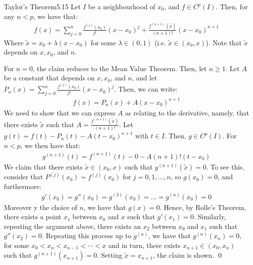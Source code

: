 \begin{theorem}{Taylor's Theorem}{5.15}
    Let $I$ be a neighbourhood of $x_0$, and $f \in C^p(I)$. Then, for any $n < p$, we have that:
    \begin{align*}
        f(x) = \sum_{j=0}^n \frac{f^{(j)}(x_0)}{j!}(x- x_0)^j + \frac{f^{(n+1)}(\tilde{x})}{(n+1)!}(x - x_0)^{n+1}
    \end{align*}
    Where $\tilde{x} = x_0 + \lambda(x - x_0)$ for some $\lambda \in (0, 1)$ (i.e. $\tilde{x} \in (x_0, x)$). Note that $\tilde{x}$ depends on $x, x_0$, and $n$. 
\end{theorem}
\begin{nproof}
    For $n = 0$, the claim reduces to the Mean Value Theorem. Then, let $n \geq 1$. Let $A$ be a constant that depends on $x, x_0$, and $n$, and let $P_n(x) = \sum_{j=0}^n \frac{f^{(j)}(x_0)}{j!}(x-x_0)^j$. Then, we can write:
    \begin{align*}
        f(x) = P_n(x) + A(x-x_0)^{n+1}
    \end{align*}
    We need to show that we can express $A$ as relating to the derivative, namely, that there exists $\tilde{x}$ such that $A = \frac{f^{(n+1)}(\tilde{x})}{(n+1)!}$. Let $g(t) = f(t) - P_n(t) - A(t - x_0)^{n+1}$ with $t \in I$. Then, $g \in C^{p}(I)$. For $n < p$, we then have that:
    \begin{align*}
        g^{(n+1)}(t) = f^{(n+1)}(t) - 0 - A(n+1)!(t - x_0)
    \end{align*}
    We claim that there exists $\tilde{x} \in (x_0, x)$ such that $g^{(n+1)}(\tilde{x}) = 0$. To see this, consider that $P^{(j)}(x_0) = f^{(j)}(x_0)$ for $j = 0, 1, \ldots, n$, so $g(x_0) = 0$, and furthermore:
    \begin{align*}
        g'(x_0) = g''(x_0) = g^{(3)}(x_0) = \ldots = g^{(n)}(x_0) = 0
    \end{align*}
    Moreover y the choice of $n$, we have that $g(x) = 0$. Hence, by Rolle's Theorem, there exists a point $x_1$ between $x_0$ and $x$ such that $g'(x_1) = 0$. Similarly, repeating the argument above, there exists an $x_2$ between $x_0$ and $x_1$ such that $g''(x_2) = 0$. Repeating this process up to $g^{(n)}$, we have that $g^{(n)}(x_n) = 0$, for some $x_0 < x_{n} < x_{n-1} < \cdots < x$ and in turn, there exists $x_{n+1} \in (x_0, x_n)$ such that $g^{(n+1)}(x_{n+1}) = 0$. Setting $\tilde{x} = x_{n+1}$, the claim is shown. \qed
\end{nproof}

